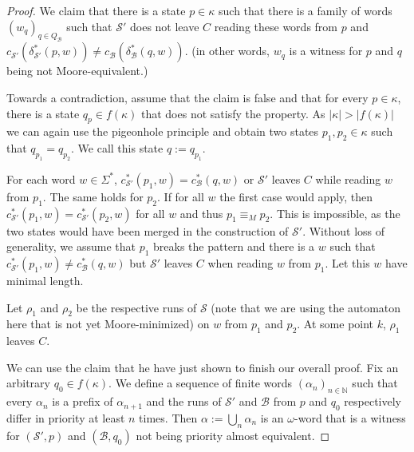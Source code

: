 \begin{proof}
	\vspace{5pt}
	
	We claim that there is a state $p \in \kappa$ such that there is a family of words $(w_q)_{q \in Q_{\mathcal{B}}}$ such that $\mathcal{S}'$ does not leave $C$ reading these words from $p$ and $c_{\mathcal{S}'}(\delta_{\mathcal{S}'}^*(p, w)) \neq c_{\mathcal{B}}(\delta_{\mathcal{B}}^*(q, w))$. (in other words, $w_q$ is a witness for $p$ and $q$ being not Moore-equivalent.)
	
	Towards a contradiction, assume that the claim is false and that for every $p \in \kappa$, there is a state $q_p \in f(\kappa)$ that does not satisfy the property. As $|\kappa| > |f(\kappa)|$ we can again use the pigeonhole principle and obtain two states $p_1, p_2 \in \kappa$ such that $q_{p_1} = q_{p_2}$. We call this state $q := q_{p_1}$.
	
	For each word $w \in \Sigma^*$, $c_{\mathcal{S}'}^*(p_1, w) = c_{\mathcal{B}}^*(q, w)$ or $\mathcal{S}'$ leaves $C$ while reading $w$ from $p_1$. The same holds for $p_2$. If for all $w$ the first case would apply, then $c_{\mathcal{S}'}^*(p_1, w) = c_{\mathcal{S}'}^*(p_2, w)$ for all $w$ and thus $p_1 \equiv_M p_2$. This is impossible, as the two states would have been merged in the construction of $\mathcal{S}'$. Without loss of generality, we assume that $p_1$ breaks the pattern and there is a $w$ such that $c_{\mathcal{S}'}^*(p_1, w) \neq c_{\mathcal{B}}^*(q, w)$ but $\mathcal{S}'$ leaves $C$ when reading $w$ from $p_1$. Let this $w$ have minimal length.
	
	Let $\rho_1$ and $\rho_2$ be the respective runs of $\mathcal{S}$ (note that we are using the automaton here that is not yet Moore-minimized) on $w$ from $p_1$ and $p_2$. At some point $k$, $\rho_1$ leaves $C$.
	
	\vspace{5pt}
	
	We can use the claim that he have just shown to finish our overall proof. Fix an arbitrary $q_0 \in f(\kappa)$. We define a sequence of finite words $(\alpha_n)_{n \in \mathbb{N}}$ such that every $\alpha_n$ is a prefix of $\alpha_{n+1}$ and the runs of $\mathcal{S}'$ and $\mathcal{B}$ from $p$ and $q_0$ respectively differ in priority at least $n$ times. Then $\alpha := \bigcup_n \alpha_n$ is an $\omega$-word that is a witness for $(\mathcal{S}', p)$ and $(\mathcal{B}, q_0)$ not being priority almost equivalent.
	

\end{proof}
